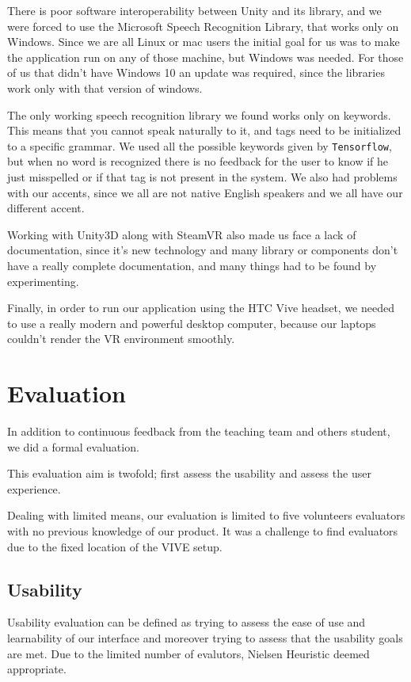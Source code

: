 \documentclass[11pt,a4paper]{article}
\begin{document}
There is poor software interoperability between Unity and its library, and we were forced to use the Microsoft Speech Recognition Library, that works only on Windows. 
Since we are all Linux or mac users the initial goal for us was to make the application run on any of those machine, but Windows was needed.
For those of us that didn't have Windows 10 an update was required, since the libraries work only with that version of windows.

The only working speech recognition library we found works only on keywords. This means that you cannot speak naturally to it, and tags need to be initialized to a specific grammar. We used all the possible keywords given by \texttt{Tensorflow}, but when no word is recognized there is no feedback for the user to know if he just misspelled or if that tag is not present in the system.
We also had problems with our accents, since we all are not native English speakers and we all have our different accent.

Working with Unity3D along with SteamVR also made us face a lack of documentation, since it's new technology and many library or components don't have a really complete documentation, and many things had to be found by experimenting.

Finally, in order to run our application using the HTC Vive headset, we needed to use a really modern and powerful desktop computer, because our laptops couldn't render the VR environment smoothly.

\section{Evaluation} \label{eval}

In addition to continuous feedback from the teaching team and others student, we did a formal evaluation.

This evaluation aim is twofold; first assess the usability and assess the user experience.

Dealing with limited means, our evaluation is limited to five volunteers evaluators with no previous knowledge of our product. It was a challenge to find evaluators due to the fixed location of the VIVE setup.

\subsection{Usability}

Usability evaluation can be defined as trying to assess the ease of use and learnability of our interface and moreover trying to assess that the usability goals are met. Due to the limited number of evalutors, Nielsen Heuristic deemed appropriate.
\end{document}
